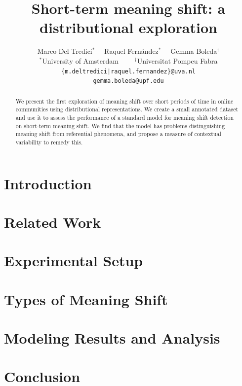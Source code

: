 \documentclass[11pt,a4paper]{article}
\title{Short-term meaning shift: a distributional exploration}
\author{Marco Del Tredici$^*$ \ \ Raquel Fern\'andez$^*$ \ \  Gemma Boleda$^\dagger$\\
$^*$University of Amsterdam \ \ \ \ $^\dagger$Universitat Pompeu Fabra\\
  {\tt \{m.deltredici|raquel.fernandez\}@uva.nl}\\  
  {\tt gemma.boleda@upf.edu}
}
\date{}
\begin{document}
\maketitle
\begin{abstract}
We present the first exploration of meaning shift over short periods of time in online communities using distributional representations. We create a small annotated dataset and use it to assess the performance of a standard model for meaning shift detection on short-term meaning shift. We find that the model has problems distinguishing meaning shift from referential phenomena, and propose a measure of contextual variability to remedy this.
\end{abstract}

\section{Introduction}
\label{sect:Introduction}

 
\section{Related Work}
\label{sect:Related_Work}


\section{Experimental Setup}
\label{sec:setup}


\section{Types of Meaning Shift}
\label{sec:types}


\section{Modeling Results and Analysis}
\label{sec:results}


\section{Conclusion}
\label{sect:conc}

\end{document}
